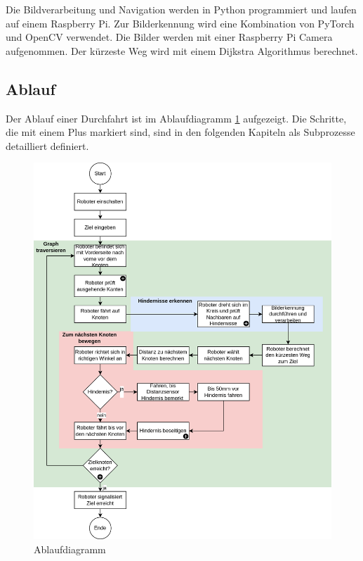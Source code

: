 Die Bildverarbeitung und Navigation werden in Python programmiert und laufen auf einem Raspberry Pi. Zur Bilderkennung wird eine Kombination von PyTorch und OpenCV verwendet. Die Bilder werden mit einer Raspberry Pi Camera aufgenommen. Der kürzeste Weg wird mit einem Dijkstra Algorithmus berechnet.

\subsection{Ablauf}

Der Ablauf einer Durchfahrt ist im Ablaufdiagramm \ref{fig:ablaufdiagramm} aufgezeigt.
Die Schritte, die mit einem Plus markiert sind, sind in den folgenden Kapiteln als Subprozesse detailliert definiert.

\begin{figure}[H]
\centering
\includegraphics[width=\textwidth]{assets/gesamtkonzept/ablaufdiagramm.png}
\caption{Ablaufdiagramm}
\label{fig:ablaufdiagramm}
\end{figure}

